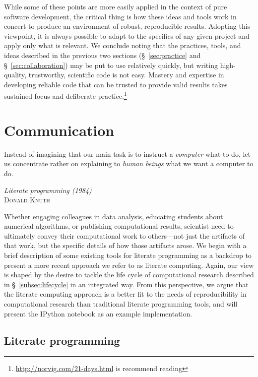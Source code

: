 \documentclass[11pt,oneside,english]{article}
\begin{document}
While some of these points are more easily applied in the context of pure
software development, the critical thing is how these ideas and tools work in
concert to produce an environment of robust, reproducible results.  Adopting
this viewpoint, it is always possible to adapt to the specifics of any given
project and apply only what is relevant. We conclude noting that the practices,
tools, and ideas described in the previous two sections (§~\ref{sec:practice}
and §~\ref{sec:collaboration}) may be put to use relatively quickly, but
writing high-quality, trustworthy, scientific code is not easy. Mastery and
expertise in developing reliable code that can be trusted to provide valid
results takes sustained focus and deliberate
practice.\footnote{\url{http://norvig.com/21-days.html} is recommend reading}

\section{\label{sec:communication}Communication}

\setlength{\epigraphrule}{0pt}
\setlength{\epigraphwidth}{.90\textwidth}
\epigraph%
{%
Instead of imagining that our main task is to instruct a \emph{computer}
what to do, let us concentrate rather on explaining to \emph{human beings}
what we want a computer to do.
}%
{\textit{Literate programming (1984)}\\ \textsc{Donald Knuth} }

Whether engaging colleagues in data analysis, educating students about
numerical algorithms, or publishing computational results, scientist need to
ultimately convey their computational work to others---not just the artifacts
of that work, but the specific details of how those artifacts arose.  We begin
with a brief description of some existing tools for literate programming as a
backdrop to present a more recent approach we refer to as literate computing.
Again, our view is shaped by the desire to tackle the life cycle of
computational research described in §~\ref{subsec:lifecycle} in an integrated way.
From this perspective, we argue that the literate computing approach is a
better fit to the needs of reproducibility in computational research than
traditional literate programming tools, and will present the IPython notebook
as an example implementation.

\subsection{Literate programming}
\end{document}
